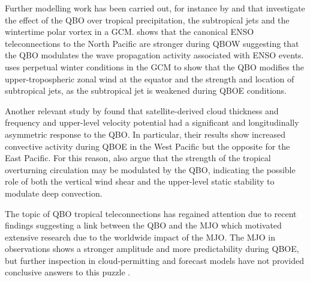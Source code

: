 Further modelling work has been carried out, for instance by \cite{garfinkel2010} and \cite{garfinkel2011} that investigate the effect of the QBO over tropical precipitation, the subtropical jets and the wintertime polar vortex in a GCM. \cite{garfinkel2010} shows that the canonical ENSO teleconnections to the North Pacific are stronger during QBOW suggesting that the QBO modulates the wave propagation activity associated with ENSO events.
 \cite{garfinkel2011} uses perpetual winter conditions in the GCM to show that the QBO modifies the upper-tropospheric zonal wind at the equator and the strength and location of subtropical jets, as the subtropical jet is weakened during QBOE conditions.


Another relevant study by \cite{liess2012} found that satellite-derived cloud thickness and frequency  and upper-level velocity potential had a significant and longitudinally asymmetric response to the QBO. In particular, their results show increased convective activity during QBOE in the West Pacific but the opposite for the East Pacific.  For this reason, \cite{liess2012} also argue that the strength of the tropical overturning circulation may be modulated by the QBO, indicating the possible role of both the vertical wind shear and the upper-level static stability to modulate deep convection. 

The topic of QBO tropical teleconnections has regained attention due to recent findings suggesting a link between the QBO and the MJO \citep{son2017} which motivated extensive research \citep[see e.g.][]{lee2018,wang2019,martin2020jgr} due to the worldwide impact of the MJO.
 The MJO in observations shows a stronger amplitude and more predictability during QBOE, but further inspection in cloud-permitting and forecast models have not provided conclusive answers to this puzzle \citep{martin2019,martin2020jgr}. 
 
 
